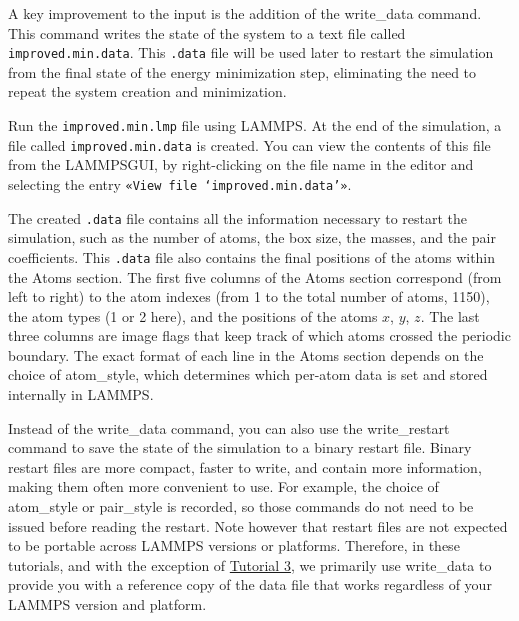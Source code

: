 \documentclass[9pt,tutorial]{livecoms}
\newcommand{\lmpcmd}[1]{\hspace{0pt}\colorbox{listing}{\textcolor{command}{\small{#1}}}\hspace{0pt}} %
\newcommand{\lmpcmdnote}[1]{\hspace{0pt}\colorbox{note_listing}{\textcolor{command}{\small{#1}}}\hspace{0pt}} %
\newcommand{\flecmd}[1]{\textcolor{command}{\texttt{#1}}} %
\newcommand{\guicmd}[1]{\textcolor{command}{\texttt{«#1»}}} %
\newcommand{\lammpsgui}{\textsf{LAMMPS\textendash GUI}}
\begin{document}
\begin{note}
A key improvement to the input is the addition of the
\lmpcmd{write\_data} command.  This command writes the state
of the system to a text file called \flecmd{improved.min.data}.
This \flecmd{.data} file will be used later
to restart the simulation from the final state of the energy
minimization step, eliminating the need to repeat the system creation and minimization.
\end{note}

Run the \flecmd{improved.min.lmp} file using LAMMPS.  At the end of the simulation,
a file called \flecmd{improved.min.data} is created.  You can view the contents
of this file from the \lammpsgui{}, by right-clicking on the file name in
the editor and selecting the entry \guicmd{View file `improved.min.data'}.

The created \flecmd{.data} file contains all the information necessary to
restart the simulation, such as the number of atoms, the box size, the
masses, and the pair coefficients.  This \flecmd{.data} file also contains the final
positions of the atoms within the \lmpcmd{Atoms} section.  The first five
columns of the \lmpcmd{Atoms} section correspond (from left to right) to
the atom indexes (from 1 to the total number of atoms, 1150), the atom
types (1 or 2 here), and the positions of the atoms $x$, $y$, $z$.  The
last three columns are image flags that keep track of which atoms
crossed the periodic boundary.  The exact format of each line in the
\lmpcmd{Atoms} section depends on the choice of \lmpcmd{atom\_style}, which
determines which per-atom data is set and stored internally in LAMMPS.

\begin{note}
Instead of the \lmpcmdnote{write\_data} command, you can also use the
\lmpcmdnote{write\_restart} command to save the state
of the simulation to a binary restart file.  Binary restart files are
more compact, faster to write, and contain more information, making them often
more convenient to use.  For example, the choice of \lmpcmdnote{atom\_style}
or \lmpcmdnote{pair\_style} is recorded, so those commands do not need to be issued
before reading the restart.  Note however that restart files are not expected to be
portable across LAMMPS versions or platforms.  Therefore, in these tutorials,
and with the exception of \hyperref[all-atom-label]{Tutorial 3}, we primarily use \lmpcmdnote{write\_data} to provide you with a reference
copy of the data file that works regardless of your LAMMPS version and platform.
\end{note}
\end{document}
